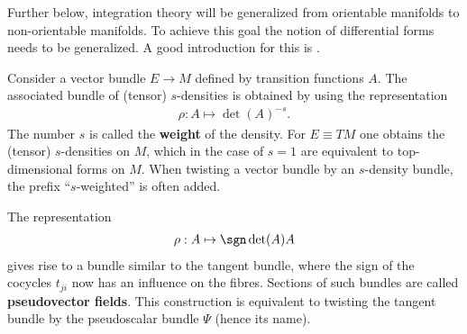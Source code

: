     Further below, integration theory will be generalized from orientable manifolds to non-orientable manifolds. To achieve this goal the notion of differential forms needs to be generalized. A good introduction for this is \cite{tensor_bundle_calculus}.

    \begin{definition}\label{bundle:density}
        Consider a vector bundle $E\rightarrow M$ defined by transition functions $A$. The associated bundle of (tensor) $s$-densities is obtained by using the representation
        \begin{gather}
            \rho:A\mapsto\det(A)^{-s}.
        \end{gather}
        The number $s$ is called the \textbf{weight} of the density. For $E\equiv TM$ one obtains the (tensor) $s$-densities on $M$, which in the case of $s=1$ are equivalent to top-dimensional forms on $M$. When twisting a vector bundle by an $s$-density bundle, the prefix ``$s$-weighted'' is often added.
    \end{definition}

    \begin{example}[Pseudovectors]
        The representation
        \begin{gather}
            \rho:A\mapsto\sgn\det(A)A
        \end{gather}
        gives rise to a bundle similar to the tangent bundle, where the sign of the cocycles $t_{ji}$ now has an influence on the fibres. Sections of such bundles are called \textbf{pseudovector fields}. This construction is equivalent to twisting the tangent bundle by the pseudoscalar bundle $\Psi$ (hence its name).
    \end{example}

